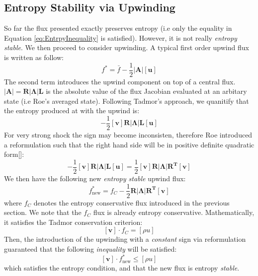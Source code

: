 \documentclass[a4paper]{article}
\numberwithin{equation}{section}
\begin{document}
\subsection{Entropy Stability via Upwinding}
So far the flux presented exactly preserves entropy (i.e only the equality in Equation \ref{eq:EntrpyInequality} is satisfied). However, it is not really \textit{entropy stable}. We then proceed to consider upwinding. A typical first order upwind flux is written as follow:
\begin{equation} \label{eq:oldFlux}
    f^* = \bar{f} - \frac{1}{2}\left|\mathbf{A} \right| \left[\mathbf{u}\right]
\end{equation}
The second term introduces the upwind component on top of a central flux. $\left|\mathbf{A}\right| = \mathbf{R \left|\Lambda \right| L }$ is the absolute value of the flux Jacobian evaluated at an arbitary state (i.e Roe's averaged state). Following Tadmor's approach, we quanitify that the entropy produced at with the upwind is:
\begin{equation}
    -\frac{1}{2} \left[\mathbf{v}\right] \mathbf{R \left|\Lambda \right| L } \left[\mathbf{u}\right]
\end{equation}
For very strong shock the sign may become inconsisten, therefore Roe introduced a reformulation such that the right hand side will be in positive definite quadratic form[]:
\begin{equation}
    -\frac{1}{2} \left[\mathbf{v}\right] \mathbf{R \left|\Lambda \right| L } \left[\mathbf{u}\right] = \frac{1}{2}\left[\mathbf{v}\right] \mathbf{R \left|\Lambda \right| R^T } \left[\mathbf{v}\right]
\end{equation}
We then have the following new \textit{entropy stable} upwind flux:
\begin{equation} \label{eq:newFlux}
    f^*_{\text{new}} = f_C - \frac{1}{2} \mathbf{R \left|\Lambda \right| R^T } \left[\mathbf{v}\right]
\end{equation}
where $f_C$ denotes the entropy conservative flux introduced in the previous section. We note that the $f_C$ flux is already entropy conservative. Mathematically, it satisfies the Tadmor conservation criterion: 
\begin{equation}
    \left[\mathbf{v}\right]\cdot f_C = \left[\rho u\right]
\end{equation}
Then, the introduction of the upwinding with a \textit{constant} sign via reformulation guaranteed that the following \textit{inequality} will be satisfied:
\begin{equation}
    \left[\mathbf{v}\right] \cdot f^*_{\text{new}} \leq \left[\rho u\right]
\end{equation}
which satisfies the entropy condition, and that the new flux is entropy \textit{stable}. 
\end{document}
